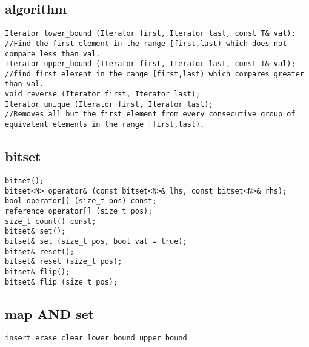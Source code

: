 \subsection*{algorithm}
\begin{lstlisting}
Iterator lower_bound (Iterator first, Iterator last, const T& val);
//Find the first element in the range [first,last) which does not compare less than val.
Iterator upper_bound (Iterator first, Iterator last, const T& val);
//find first element in the range [first,last) which compares greater than val.
void reverse (Iterator first, Iterator last);
Iterator unique (Iterator first, Iterator last);
//Removes all but the first element from every consecutive group of equivalent elements in the range [first,last).
\end{lstlisting}

\subsection*{bitset}
\begin{lstlisting}
bitset();
bitset<N> operator& (const bitset<N>& lhs, const bitset<N>& rhs);
bool operator[] (size_t pos) const;
reference operator[] (size_t pos);
size_t count() const;
bitset& set();
bitset& set (size_t pos, bool val = true);
bitset& reset();
bitset& reset (size_t pos);
bitset& flip();
bitset& flip (size_t pos);
\end{lstlisting}

\subsection*{map AND set}
\begin{lstlisting}
insert erase clear lower_bound upper_bound
\end{lstlisting}

